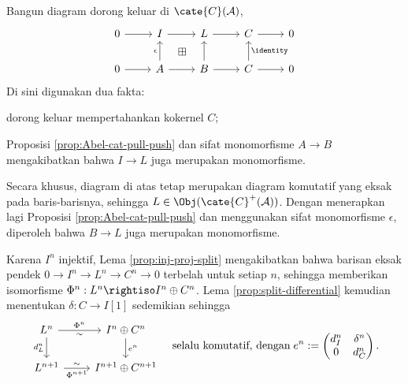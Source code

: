 \begin{bukti}
	Bangun diagram dorong keluar di $\cate{C}(\mathcal{A})$,
	\[\begin{tikzcd}
		0 \arrow[r] & I \arrow[r] & L \arrow[r] \arrow[phantom, ld, "\boxplus" description] & C \arrow[r] & 0 \\
		0 \arrow[r] & A \arrow[r] \arrow[u, "\epsilon"] & B \arrow[r] \arrow[u] & C \arrow[r] \arrow[u, "\identity"'] & 0 
	\end{tikzcd}\]
	Di sini digunakan dua fakta:
	\begin{compactitem}
		\item dorong keluar mempertahankan kokernel $C$;
		\item Proposisi \ref{prop:Abel-cat-pull-push} dan sifat monomorfisme $A \to B$ mengakibatkan bahwa $I \to L$ juga merupakan monomorfisme.
	\end{compactitem}
	Secara khusus, diagram di atas tetap merupakan diagram komutatif yang eksak pada baris-barisnya, sehingga $L \in \Obj(\cate{C}^+(\mathcal{A}))$. Dengan menerapkan lagi Proposisi \ref{prop:Abel-cat-pull-push} dan menggunakan sifat monomorfisme $\epsilon$, diperoleh bahwa $B \to L$ juga merupakan monomorfisme.

	Karena $I^n$ injektif, Lema \ref{prop:inj-proj-split} mengakibatkan bahwa barisan eksak pendek $0 \to I^n \to L^n \to C^n \to 0$ terbelah untuk setiap $n$, sehingga memberikan isomorfisme $\Phi^n: L^n \rightiso I^n \oplus C^n$. Lema \ref{prop:split-differential} kemudian menentukan $\delta: C \to I[1]$ sedemikian sehingga
	\begin{equation}\label{eqn:horseshoe-aux}\begin{tikzcd}
		L^n \arrow[r, "{\Phi^n}", "\sim"'] \arrow[d, "{d_L^n}"'] & I^n \oplus C^n \arrow[d, "{e^n}"] \\
		L^{n+1} \arrow[r, "{\Phi^{n+1}}"', "\sim"] & I^{n+1} \oplus C^{n+1}
		\end{tikzcd} \quad \text{selalu komutatif, dengan}\;
		e^n := \begin{pmatrix} d_I^n & \delta^n \\ 0 & d_C^n \end{pmatrix}.
	\end{equation}


\end{bukti}
